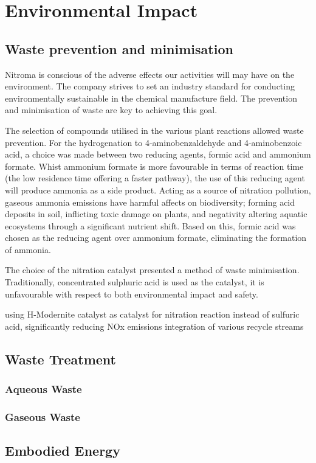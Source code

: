 \section{Environmental Impact}

\subsection{Waste prevention and minimisation }

Nitroma is conscious of the adverse effects our activities will may have on the environment. The company strives to set an industry standard for conducting environmentally sustainable in the chemical manufacture field. The prevention and minimisation of waste are key to achieving this goal. 

The selection of compounds utilised in the various plant reactions allowed waste prevention. For the hydrogenation to 4-aminobenzaldehyde and 4-aminobenzoic acid, a choice was made between two reducing agents, formic acid and ammonium formate. Whist ammonium formate is more favourable in terms of reaction time (the low residence time offering a faster pathway), the use of this reducing agent will produce ammonia as a side product. Acting as a  source of nitration pollution, gaseous ammonia emissions have harmful affects on biodiversity; forming acid deposits in soil, inflicting toxic damage on plants, and negativity altering aquatic ecosystems through a significant nutrient shift. Based on this, formic acid was chosen as the reducing agent over ammonium formate, eliminating the formation of ammonia. 

The choice of the nitration catalyst presented a method of waste minimisation. Traditionally, concentrated sulphuric acid is used as the catalyst, it is unfavourable with respect to both environmental impact and safety. 





    
    using H-Modernite catalyst as catalyst for nitration reaction instead of sulfuric acid, significantly reducing NOx emissions
  integration of various recycle streams


\subsection{Waste Treatment}

\subsubsection{Aqueous Waste}


\subsubsection{Gaseous Waste}

\subsection{Embodied Energy}
